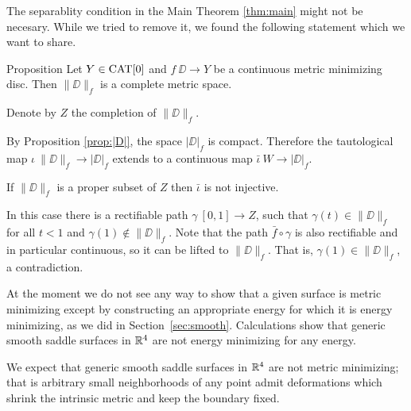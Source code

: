 \documentclass[a4paper,10pt]{amsart}
\begin{document}
The separablity condition in the Main Theorem \ref{thm:main}
might not be necesary.
While we tried to remove it, we found the following statement 
which we want to share.

\begin{thm}{Proposition}
Let $Y\in\mathop{\rm CAT}\nolimits[0]$ 
and 
$f\:\DD\to Y$ be a continuous metric minimizing disc.
Then $\|\DD\|_f$ is a complete metric space.
\end{thm}

Denote by $Z$ the completion of $\|\DD\|_f$.

By Proposition \ref{prop:|D|},
the space $|\DD|_f$ is compact.
Therefore the tautological map $\iota\:\|\DD\|_f\to |\DD|_f$ 
extends to a continuous map $\bar \iota\:W\to |\DD|_f$.

If $\|\DD\|_f$ is a proper subset of $Z$ 
then $\bar \iota$ is not injective.

In this case there is a rectifiable path $\gamma\:[0,1]\to Z$,
such that $\gamma(t)\in\|\DD\|_f$ for all $t<1$ and $\gamma(1)\notin \|\DD\|_f$.
Note that the path $\bar f\circ \gamma$ is also rectifiable and in particular continuous, so it can be lifted to $\|\DD\|_f$.
That is, $\gamma(1)\in \|\DD\|_f$, a contradiction.
\qeds

At the moment we do not see any way to show that a given surface is metric minimizing except by constructing an appropriate energy for which it is energy minimizing, as we did in Section~\ref{sec:smooth}.
Calculations show that generic smooth saddle surfaces in $\mathbb{R}^4$ are not energy minimizing for any energy.

We expect that generic smooth saddle surfaces in $\mathbb{R}^4$ are not metric minimizing; that is arbitrary small neighborhoods of any point admit deformations which shrink 
the intrinsic metric and keep the boundary fixed.
\end{document}

